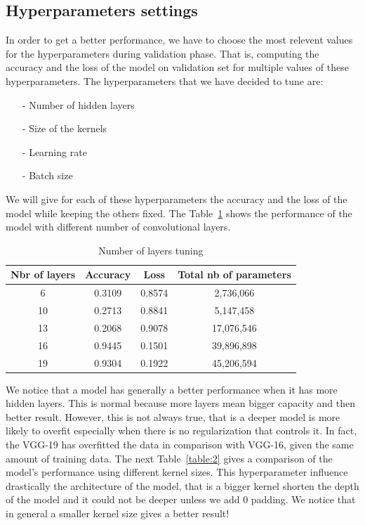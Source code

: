 \documentclass[a4paper]{article}
\begin{document}
\subsection{Hyperparameters settings}
In order to get a better performance, we have to choose the most relevent values for the hyperparameters during validation phase. That is, computing the accuracy and the loss of the model on validation set for multiple values of these hyperparameters. The hyperparameters that we have decided to tune are:
\begin{itemize}
\setlength\itemsep{0em}
\item[-]Number of hidden layers
\item[-]Size of the kernels
\item[-]Learning rate
\item[-]Batch size
\end{itemize}
%
We will give for each of these hyperparameters the accuracy and the loss of the model while keeping the others fixed.
%
The Table~\ref{table:1} shows the performance of the model with different number of convolutional layers.
%
\begin{table}[h!]
	\centering
	\begin{tabular}{||c c c c||} 
		\hline
		Nbr of layers & Accuracy & Loss & Total nb of parameters\\ [0.5ex] 
		\hline\hline
		6 & 0.3109 & 0.8574 & 2,736,066\\ 
		10 & 0.2713 & 0.8841 & 5,147,458\\ 
		13 & 0.2068 & 0.9078 & 17,076,546\\ 
		16 & 0.9445 & 0.1501 & 39,896,898\\
		19 & 0.9304 & 0.1922 & 45,206,594\\  [1ex] 
		\hline
	\end{tabular}
	\caption{Number of layers tuning}
	\label{table:1}
\end{table}
%
We notice that a model has generally a better performance when it has more hidden layers. This is normal because more layers mean bigger capacity and then better result. However, this is not always true, that is a deeper model is more likely to overfit especially when there is no regularization that controls it. In fact, the VGG-19 has overfitted the data in comparison with VGG-16, given the same amount of training data.
%
The next Table~\ref{table:2} gives a comparison of the model's performance using different kernel sizes. This hyperparameter influence drastically the architecture of the model, that is a bigger kernel shorten the depth of the model and it could not be deeper unless we add 0 padding. We notice that in general a smaller kernel size gives a better result!
\end{document}
